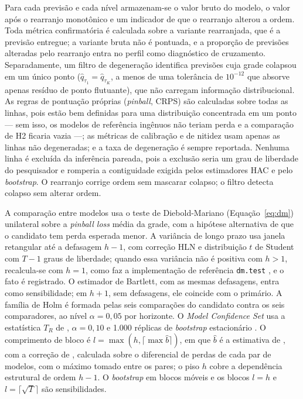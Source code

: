 Para cada previsão e cada nível armazenam-se o valor bruto do modelo, o valor após o rearranjo monotônico e um indicador de que o rearranjo alterou a ordem. Toda métrica confirmatória é calculada sobre a variante rearranjada, que é a previsão entregue; a variante bruta não é pontuada, e a proporção de previsões alteradas pelo rearranjo entra no perfil como diagnóstico de cruzamento. Separadamente, um filtro de degeneração identifica previsões cuja grade colapsou em um único ponto (\(\hat{q}_{\tau_1} = \hat{q}_{\tau_K}\), a menos de uma tolerância de \(10^{-12}\) que absorve apenas resíduo de ponto flutuante), que não carregam informação distribucional. As regras de pontuação próprias (\textit{pinball}, CRPS) são calculadas sobre todas as linhas, pois estão bem definidas para uma distribuição concentrada em um ponto --- sem isso, os modelos de referência ingênuos não teriam perda e a comparação de H2 ficaria vazia ---; as métricas de calibração e de nitidez usam apenas as linhas não degeneradas; e a taxa de degeneração é sempre reportada. Nenhuma linha é excluída da inferência pareada, pois a exclusão seria um grau de liberdade do pesquisador e romperia a contiguidade exigida pelos estimadores HAC e pelo \textit{bootstrap}. O rearranjo corrige ordem sem mascarar colapso; o filtro detecta colapso sem alterar ordem.

A comparação entre modelos usa o teste de Diebold-Mariano (Equação~\ref{eq:dm}) unilateral sobre a \textit{pinball loss} média da grade, com a hipótese alternativa de que o candidato tem perda esperada menor. A variância de longo prazo usa janela retangular até a defasagem \(h-1\), com correção HLN e distribuição \(t\) de Student com \(T-1\) graus de liberdade; quando essa variância não é positiva com \(h > 1\), recalcula-se com \(h = 1\), como faz a implementação de referência \texttt{dm.test} \cite{RFORECAST}, e o fato é registrado. O estimador de Bartlett, com as mesmas defasagens, entra como sensibilidade; em \(h+1\), sem defasagens, ele coincide com o primário. A família de Holm é formada pelas seis comparações do candidato contra os seis comparadores, ao nível \(\alpha = 0{,}05\) por horizonte. O \textit{Model Confidence Set} usa a estatística \(T_R\) de , \(\alpha = 0{,}10\) e 1.000 réplicas de \textit{bootstrap} estacionário \cite{POLITISROMANO1994}. O comprimento de bloco é \(l = \max(h, \lceil \max \hat{b} \rceil)\), em que \(\hat{b}\) é a estimativa de , com a correção de , calculada sobre o diferencial de perdas de cada par de modelos, com o máximo tomado entre os pares; o piso \(h\) cobre a dependência estrutural de ordem \(h-1\). O \textit{bootstrap} em blocos móveis e os blocos \(l = h\) e \(l = \lceil\sqrt{T}\rceil\) são sensibilidades.

